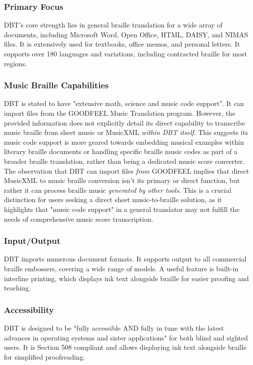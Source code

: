 \subsubsection{Primary Focus}
DBT's core strength lies in general braille translation for a wide array of documents, including Microsoft Word, Open Office, HTML, DAISY, and NIMAS files. It is extensively used for textbooks, office memos, and personal letters. \cite{duxbury-brochure} It supports over 180 languages and variations, including contracted braille for most regions. \cite{duxbury-dbt, duxbury-brochure}

\subsubsection{Music Braille Capabilities}
DBT is stated to have "extensive math, science and music code support". \cite{duxbury-dbt} It can import files from the GOODFEEL Music Translation program. \cite{duxbury-brochure} However, the provided information does not explicitly detail its direct capability to transcribe music braille from sheet music or MusicXML \textit{within DBT itself}. \cite{duxbury-dbt} This suggests its music code support is more geared towards embedding musical examples within literary braille documents or handling specific braille music codes as part of a broader braille translation, rather than being a dedicated music score converter. The observation that DBT can import files \textit{from} GOODFEEL implies that direct MusicXML to music braille conversion isn't its primary or direct function, but rather it can process braille music \textit{generated by other tools}. \cite{duxbury-brochure} This is a crucial distinction for users seeking a direct sheet music-to-braille solution, as it highlights that "music code support" in a general translator may not fulfill the needs of comprehensive music score transcription.

\subsubsection{Input/Output}
DBT imports numerous document formats. \cite{duxbury-brochure} It supports output to all commercial braille embossers, covering a wide range of models. \cite{duxbury-dbt} A useful feature is built-in interline printing, which displays ink text alongside braille for easier proofing and teaching. \cite{duxbury-brochure}

\subsubsection{Accessibility}
DBT is designed to be "fully accessible AND fully in tune with the latest advances in operating systems and sister applications" for both blind and sighted users. \cite{duxbury-brochure} It is Section 508 compliant \cite{duxbury-dbt} and allows displaying ink text alongside braille for simplified proofreading. \cite{duxbury-dbt}


